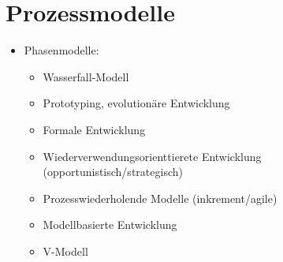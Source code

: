 \documentclass[10pt,a5paper]{article}
\begin{document}
\section{Prozessmodelle}
\begin{itemize}
\item Phasenmodelle:\begin{itemize}
\item Wasserfall-Modell
\item Prototyping, evolutionäre Entwicklung
\item Formale Entwicklung
\item Wiederverwendungsorienttierete Entwicklung (opportunistisch/strategisch)
\item Prozesswiederholende Modelle (inkrement/agile)
\item Modellbasierte Entwicklung
\item V-Modell


\end{itemize}
\end{itemize}
\end{document}
